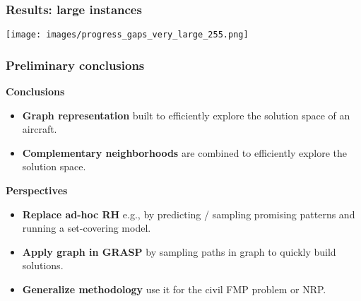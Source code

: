 \begin{frame}
\frametitle{\textbf{Results: large instances}}
  \texttt{[image: images/progress\_gaps\_very\_large\_255.png]}  
\end{frame}

\begin{frame}
\frametitle{\textbf{Preliminary conclusions}}
  \pause
  \begin{block}{\textbf{Conclusions}}
    \begin{itemize}[<+->]
    \item \textbf{Graph representation} 
      built to efficiently explore the solution space of an aircraft.
    \item \textbf{Complementary neighborhoods} 
      are combined to efficiently explore the solution space.
    \end{itemize}
  \end{block}  
  \pause
  \begin{block}{\textbf{Perspectives}}
    \begin{itemize}[<+->]
      \item \textbf{Replace ad-hoc RH}
        e.g., by predicting / sampling promising patterns and running a set-covering model.
      \item \textbf{Apply graph in GRASP}
        by sampling paths in graph to quickly build solutions.
      \item \textbf{Generalize methodology}
        use it for the civil FMP problem or NRP.
    \end{itemize}
  \end{block}  
  
\end{frame}

